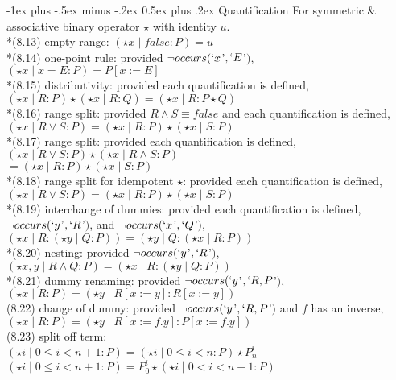 \documentclass[10pt,landscape]{article}
\makeatletter
\renewcommand{\section}{\@startsection{section}{1}{0mm}%
                                {-1ex plus -.5ex minus -.2ex}%
                                {0.5ex plus .2ex}%
                                {\normalfont\small\bfseries}}
\makeatother
\begin{document}
\begin{multicols}{3}
{\section{Quantification}
For symmetric \& associative binary operator $\star$ with identity $u$.\\
*(8.13) empty range: $(\star x\mid false: P)=u$\\
*(8.14) one-point rule: provided $\neg occurs(`x$'$,`E$'$)$,\\
\qquad$(\star x\mid x=E:P)=P[x:=E]$\\
*(8.15) distributivity: provided each quantification is defined,\\
\qquad$(\star x\mid R:P)\star(\star x\mid R:Q)=(\star x\mid R:P\star Q)$\\
*(8.16) range split: provided $R\land S\equiv false$ and each quantification is defined,\\
\qquad$(\star x\mid R\lor S:P)=(\star x\mid R:P)\star(\star x\mid S:P)$\\
*(8.17) range split: provided each quantification is defined,\\
\qquad$(\star x\mid R\lor S:P)\star(\star x\mid R\land S:P)$\\
\qquad$=(\star x\mid R:P)\star(\star x\mid S:P)$\\
*(8.18) range split for idempotent $\star$: provided each quantification is defined,\\
\qquad$(\star x\mid R\lor S:P)=(\star x\mid R:P)\star(\star x\mid S:P)$\\
*(8.19) interchange of dummies: provided each quantification is defined, $\neg occurs(`y$'$,`R$'$)$, and $\neg occurs(`x$'$,`Q$'$)$,\\
\qquad$(\star x\mid R:(\star y\mid Q:P))=(\star y\mid Q:(\star x\mid R:P))$\\
*(8.20) nesting: provided $\neg occurs(`y$'$,`R$'$)$,\\
\qquad$(\star x,y\mid R\land Q:P)=(\star x\mid R:(\star y\mid Q:P))$\\
*(8.21) dummy renaming: provided $\neg occurs(`y$'$,`R,P$'$)$,\\
\qquad $(\star x\mid R:P)=(\star y\mid R[x:=y]:R[x:=y])$\\
(8.22) change of dummy: provided $\neg occurs(`y$'$,`R,P$'$)$ and $f$ has an inverse,\\
\qquad$(\star x\mid R:P)=(\star y\mid R[x:=f.y]:P[x:=f.y])$\\
(8.23) split off term:\\
\qquad$(\star i\mid 0\leq i<n+1:P)=(\star i\mid 0\leq i<n:P)\star P^i_n$\\
\qquad$(\star i\mid 0\leq i<n+1:P)=P^i_0\star(\star i\mid 0 < i < n+1:P)$
}
\end{multicols}
\end{document}
